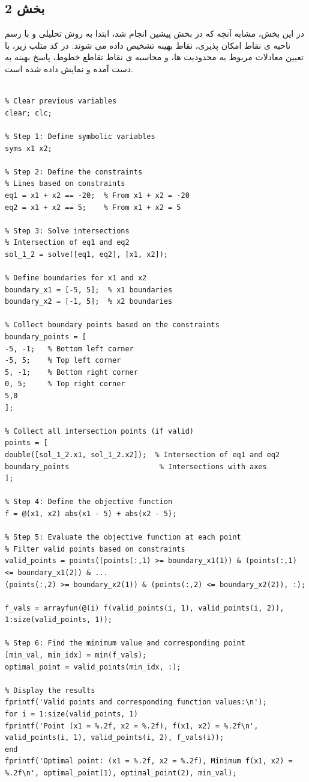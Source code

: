 \subsection{بخش 2}
در این بخش، مشابه آنچه که در بخش پیشین انجام شد، ابتدا به روش تحلیلی و با رسم ناحیه ی نقاط امکان پذیری، نقاط بهینه تشخیص داده می شوند.
در کد متلب زیر، با تعیین معادلات مربوط به محدودیت ها، و محاسبه ی نقاط تقاطع خطوط، پاسخ بهینه به دست آمده و نمایش داده شده است.

\begin{latin}
	\begin{lstlisting}[frame=single,style=Matlab-Pyglike]
		
% Clear previous variables
clear; clc;

% Step 1: Define symbolic variables
syms x1 x2;

% Step 2: Define the constraints
% Lines based on constraints
eq1 = x1 + x2 == -20;  % From x1 + x2 = -20
eq2 = x1 + x2 == 5;    % From x1 + x2 = 5

% Step 3: Solve intersections
% Intersection of eq1 and eq2
sol_1_2 = solve([eq1, eq2], [x1, x2]);

% Define boundaries for x1 and x2
boundary_x1 = [-5, 5];  % x1 boundaries
boundary_x2 = [-1, 5];  % x2 boundaries

% Collect boundary points based on the constraints
boundary_points = [
-5, -1;   % Bottom left corner
-5, 5;    % Top left corner
5, -1;    % Bottom right corner
0, 5;     % Top right corner
5,0
];

% Collect all intersection points (if valid)
points = [
double([sol_1_2.x1, sol_1_2.x2]);  % Intersection of eq1 and eq2
boundary_points                     % Intersections with axes
];

% Step 4: Define the objective function
f = @(x1, x2) abs(x1 - 5) + abs(x2 - 5);

% Step 5: Evaluate the objective function at each point
% Filter valid points based on constraints
valid_points = points((points(:,1) >= boundary_x1(1)) & (points(:,1) <= boundary_x1(2)) & ...
(points(:,2) >= boundary_x2(1)) & (points(:,2) <= boundary_x2(2)), :);

f_vals = arrayfun(@(i) f(valid_points(i, 1), valid_points(i, 2)), 1:size(valid_points, 1));

% Step 6: Find the minimum value and corresponding point
[min_val, min_idx] = min(f_vals);
optimal_point = valid_points(min_idx, :);

% Display the results
fprintf('Valid points and corresponding function values:\n');
for i = 1:size(valid_points, 1)
fprintf('Point (x1 = %.2f, x2 = %.2f), f(x1, x2) = %.2f\n', valid_points(i, 1), valid_points(i, 2), f_vals(i));
end
fprintf('Optimal point: (x1 = %.2f, x2 = %.2f), Minimum f(x1, x2) = %.2f\n', optimal_point(1), optimal_point(2), min_val);


\end{lstlisting}
\end{latin}
